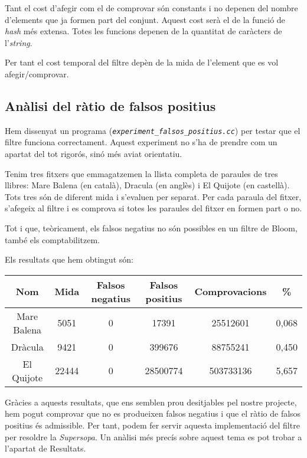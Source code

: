 \documentclass[titlepage]{article}
\begin{document}
Tant el cost d'afegir com el de comprovar són constants i no depenen del nombre d'elements que ja formen part del conjunt. Aquest cost serà el de la funció de \textit{hash} més extensa. Totes les funcions depenen de la quantitat de caràcters de l'\textit{string}. 
\newline\par
Per tant el cost temporal del filtre depèn de la mida de l'element que es vol afegir/comprovar.

\subsection{Anàlisi del ràtio de falsos positius}
Hem dissenyat un programa (\textit{\texttt{experiment\_falsos\_positius.cc}}) per testar que el filtre funciona correctament. Aquest experiment no s'ha de prendre com un apartat del tot rigorós, sinó més aviat orientatiu. 
\newline\par
Tenim tres fitxers que emmagatzemen la llista completa de paraules de tres llibres: Mare Balena (en català), Dracula (en anglès) i El Quijote (en castellà). Tots tres són de diferent mida i s'evaluen per separat. Per cada paraula del fitxer, s'afegeix al filtre i es comprova si totes les paraules del fitxer en formen part o no.
\newline\par
Tot i que, teòricament, els falsos negatius no són possibles en un filtre de Bloom, també els comptabilitzem. 
\newline\par
Els resultats que hem obtingut són:

\begin{center}
\begin{tabular}{||c c c c c c||} 
 \hline
 Nom & Mida & Falsos negatius & Falsos positius & Comprovacions & \% \\ [0.5ex] 
 \hline\hline
 Mare Balena & 5051 & 0 & 17391 & 25512601 & 0,068 \\ 
 \hline
 Dràcula & 9421 & 0 & 399676 & 88755241 & 0,450 \\
 \hline
 El Quijote & 22444 & 0 & 28500774 & 503733136 & 5,657 \\ 
 \hline
\end{tabular}
\end{center}

Gràcies a aquests resultats, que ens semblen prou desitjables pel nostre projecte, hem pogut comprovar que no es produeixen falsos negatius i que el ràtio de falsos positius és admissible. Per tant, podem fer servir aquesta implementació del filtre per resoldre la \textit{Supersopa}.
Un anàlisi més precís sobre aquest tema es pot trobar a l'apartat de Resultats.
\end{document}

